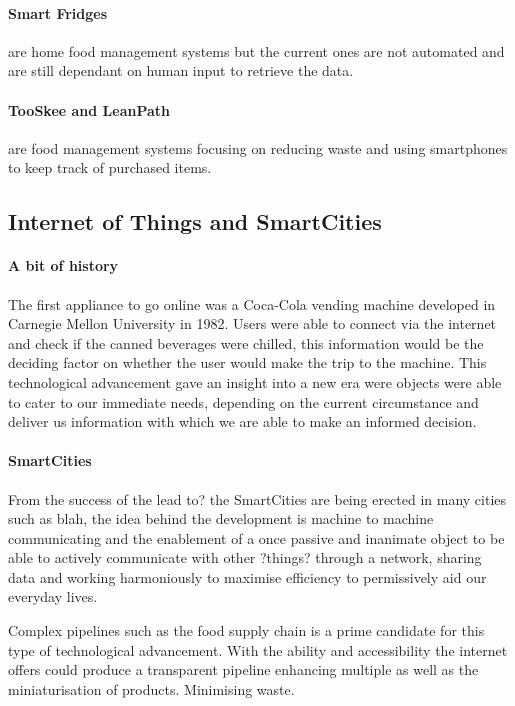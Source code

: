 \documentclass[a4paper, 11pt]{article}
\begin{document}
\paragraph{Smart Fridges} are home food management systems but the current ones are not automated and are still dependant on human input to retrieve the data.   

\paragraph{TooSkee and LeanPath} are food management systems focusing on reducing waste and using smartphones to keep track of purchased items. 

\subsection{Internet of Things and SmartCities}
\paragraph{A bit of history} The first appliance to go online was a Coca-Cola vending machine developed in Carnegie Mellon University in 1982. Users were able to connect via the internet and check if the canned beverages were chilled, this information would be the deciding factor on whether the user would make the trip to the machine. This technological advancement gave an insight into a new era were objects were able to cater to our immediate needs, depending on the current circumstance and deliver us information with which we are able to make an informed decision.

\paragraph{SmartCities} From the success of the lead to?  the SmartCities are being erected in many cities such as blah, the idea behind the development is machine to machine communicating and the enablement of a once passive and inanimate object to be able to actively communicate with other ?things? through a network, sharing data and working harmoniously to maximise efficiency to permissively aid our everyday lives. 

Complex pipelines such as the food supply chain is a prime candidate for this type of technological advancement. With the ability and accessibility the internet offers could produce a transparent pipeline enhancing multiple as well as the miniaturisation of products. Minimising waste.
\end{document}

